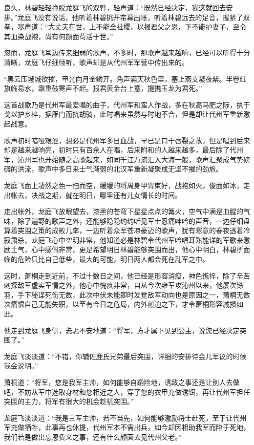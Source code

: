 良久，林碧轻轻挣脱龙庭飞的双臂，轻声道：“既然已经决定，我这就回去安排。”龙庭飞没有说话，他听着林碧挑开帘幕出帐，听着林碧远去的足音，握紧了双拳，寒声道：“大丈夫在世，上不能全社稷，以报君父之恩，下不能护妻子，至令其血染战袍，尚有何颜面苟活于世。”

忽而，龙庭飞耳边传来细弱的歌声，不多时，那歌声越来越响，已经可以听得十分清晰，龙庭飞仔细倾听，歌声却是从代州军军营中传出来的。

“黑云压城城欲摧，甲光向月金鳞开。角声满天秋色里，塞上燕支凝夜紫。半卷红旗临易水，霜重鼓寒声不起。报君黄金台上意，提携玉龙为君死。”

这首战歌乃是代州军最爱唱的曲子，代州军和蛮人作战，多在秋高马肥之际，执干戈以护乡梓，据雁门而抗胡骑，此时唱来虽然与时地不合，但是却让代州军重新激起战意。

歌声初时喑哑艰涩，想必是代州军多日血战，早已是口干唇裂之故，但是唱到后来却是越来越响亮，初时只有百余人在唱，后来附和的人越来越多，最后除了代州军，沁州军也开始随之高歌起来，如同千江万流汇入大海一般，歌声汇聚成气势磅礴的洪流，歌声中多日来士气渐弱的北汉军重新凝聚成无坚不摧的劲旅。

龙庭飞面上凄然之色一扫而空，缓缓的将周身甲胄束好，战袍如火，俊面如冰，走出帐去，决战之期，就在明日，哪里还有儿女情长的时间。

走出帐外，龙庭飞放眼望去，漆黑的苍穹下星星点点的篝火，空气中满是血腥的气味，除了遍野的歌声之外，还能够隐隐约约听见军士忍痛呻吟的声音，一边仔细盘算着突围之策的成败几率，一边听着众军苍凉豪迈的歌声，犹有寒意的春夜透着冷寂肃杀，龙庭飞心中空明非常，他知道必是林碧令代州军吟唱耳熟能详的军歌来激励士气，心中感佩非常，更是希望明日林碧能够突围而出，他心中明白，林碧所面临的危险只比自己低些，最大的可能，明日两人都会死在乱军之中。

这时，萧桐走到近前，不过十数日之间，他已经是形容消瘦，神色憔悴，除了辛苦刺探敌军虚实军情之外，他心中愧疚非常，自从今次雍军攻沁州以来，他屡次铩羽，手下秘谍死伤无数，此次中伏未能即时发觉敌军动向也是原因之一，萧桐无数次痛恨自己无能失职，以至有今日之危局，内外煎迫之下，才令萧桐形容减损如此。

他走到龙庭飞身侧，忐忑不安地道：“将军，方才属下见到公主，说您已经决定突围了。”

龙庭飞淡淡道：“不错，你辅佐鹿氏兄弟最后突围，详细的安排待会儿军议的时候我会说明。”

萧桐道：“将军，您是我军主帅，如何能够自蹈险地，诱敌之事还是让别人去做吧，不妨从军中选取身材和您相近之人，穿了您的衣甲充做诱饵，再让代州军担任突围的主力，将军有很大的机会趁机突围。”

龙庭飞淡淡道：“我是三军主帅，若不当先，如何能够激励将士赴死，至于让代州军充做牺牲，此事再也休提，代州军本不需出兵，如今却因相助我军而陷于死地，我们若是做出忘恩负义之事，还有什么颜面去见代州父老。”

